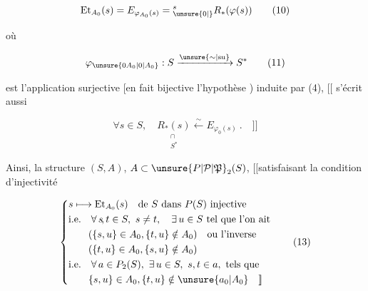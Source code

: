 \[
 \mathrm{Et}_{A_0}(s)=E_{\varphi_{A_0}(s)}={}^{s}_{\unsure{0|\vphantom{1}}}R_*(\varphi(s)) \tag*{(10)}
\]

où

\[
 \varphi_{\unsure{0A_0|0|A_0}}:S\xrightarrow{\unsure{\sim|\mathrm{su}}}S^* \tag*{(11)}
\]

est l'application  surjective [en fait bijective
 l'hypothèse )  induite par (4), 
$[\![$
 s'écrit aussi

\[
 \forall s\in S,\quad \underset{\substack{\cap\\S^*}}{R_*(s)}\xleftarrow{\sim}E_{\varphi_0(s)}\ .\quad ]\!] \tag*{(12)}
\]

Ainsi, la structure  $(S,A)$, $A\subset\unsure{P|\mathcal P|\mathfrak P}_2(S)$, $[\![$satisfaisant
la condition d'injectivité

\[
 \left\{\begin{aligned}
 &s\longmapsto\mathrm{Et}_{A_0}(s)\quad\text{de } S\text{ dans }P(S)\text{ injective}\\
 &\text{i.e.}\quad \forall\,s\!,t\in S,\ s\ne t,\quad\exists\,u\in S\text{ tel que l'on ait}\\
 &\qquad(\{s,u\}\in A_0,\{t,u\}\notin A_0)\quad\text{ou l'inverse}\\
 &\qquad(\{t,u\}\in A_0,\{s,u\}\notin A_0)\\
 &\text{i.e.}\quad \forall\,a\in P_2(S),\ \exists\,u\in S,\ s,t\in a,\text{ tels que}\\
 &\qquad\{s,u\}\in A_0,\{t,u\}\notin \unsure{a_0|A_0}\quad ]\!]
 \end{aligned}\right. \tag*{(13)}
\]

